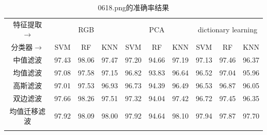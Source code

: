 \documentclass[12pt,hyperref,a4paper,UTF8]{ctexart}
\begin{document}
{%
\begin{table}[!h]
	\centering
	\caption{0618.png的准确率结果}
	\label{tab:accuracy0618}
	\begin{tabular}{@{}clllllllll@{}}
		\hline
		特征提取$\rightarrow$    & \multicolumn{3}{c}{RGB}                                                    & \multicolumn{3}{c}{PCA}                                                    & \multicolumn{3}{c}{dictionary learning}                                    \\
		分类器$\rightarrow$     & \multicolumn{1}{c}{SVM} & \multicolumn{1}{c}{RF} & \multicolumn{1}{c}{KNN} & \multicolumn{1}{c}{SVM} & \multicolumn{1}{c}{RF} & \multicolumn{1}{c}{KNN} & \multicolumn{1}{c}{SVM} & \multicolumn{1}{c}{RF} & \multicolumn{1}{c}{KNN} \\
		\hline
		中值滤波                 & 97.43                   & 98.06                  & 97.47                   & 97.20                   & 94.66                  & 97.19                   & 97.13                   & 97.46                  & 96.37                   \\
		均值滤波                 & 97.08                   & 97.58                  & 97.15                   & 96.82                   & 93.83                  & 96.64                   & 96.52                   & 97.04                  & 95.96                   \\
		高斯滤波                 & 97.01                   & 97.53                  & 96.93                   & 96.73                   & 94.39                  & 96.49                   & 96.53                   & 96.87                  & 96.05                   \\
		双边滤波                 & 97.66                   & 98.26                  & 97.51                   & 97.32                   & 94.04                  & 97.42                   & 96.72                   & 97.45                  & 96.35                   \\
		均值迁移滤波               & 97.92                   & 98.09                  & 98.00                   & 97.92                   & 94.64                  & 98.10                   & 97.94                   & 97.87                  & 97.70                   \\
		\hline
		\multicolumn{1}{l}{} &                         &                        &                         &                         &                        &                         &                         &                        &                         \\

\end{tabular}
\end{table}}
\end{document}
